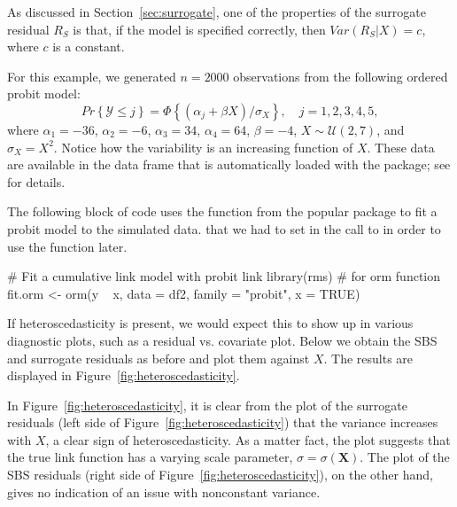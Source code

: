 As discussed in Section~\ref{sec:surrogate}, one of the properties of the surrogate residual $R_S$ is that, if the model is specified correctly, then $Var\left(R_S | X\right) = c$, where $c$ is a constant.

For this example, we generated $n = 2000$ observations from the following ordered probit model:
\begin{equation*}
  Pr\left\{\mathcal{Y} \le j\right\} = \Phi\left\{\left(\alpha_j + \beta X\right) / \sigma_X\right\}, \quad j = 1, 2, 3, 4, 5,
\end{equation*}
where $\alpha_1 = -36$, $\alpha_2 = -6$, $\alpha_3 = 34$, $\alpha_4 = 64$, $\beta = -4$, $X \sim \mathcal{U}\left(2, 7\right)$, and $\sigma_X = X ^ 2$.
Notice how the variability is an increasing function of $X$. These data are available in the  data frame that is automatically loaded with the  package; see  for details.

The following block of code uses the  function from the popular  package to fit a probit model to the simulated data.  that we had to set  in the call to  in order to use the  function later.
\begin{example}
# Fit a cumulative link model with probit link
library(rms)  # for orm function
fit.orm <- orm(y ~ x, data = df2, family = "probit", x = TRUE)
\end{example}

If heteroscedasticity is present, we would expect this to show up in various diagnostic plots, such as a residual vs. covariate plot. Below we obtain the SBS and surrogate residuals as before and plot them against $X$. The results are displayed in Figure~\ref{fig:heteroscedasticity}.

In Figure~\ref{fig:heteroscedasticity}, it is clear from the plot of the surrogate residuals (left side of Figure~\ref{fig:heteroscedasticity}) that the variance increases with $X$, a clear sign of heteroscedasticity. As a matter fact, the plot suggests that the true link function has a varying scale parameter, $\sigma = \sigma\left(\boldsymbol{X}\right)$. The plot of the SBS residuals (right side of Figure~\ref{fig:heteroscedasticity}), on the other hand, gives no indication of an issue with nonconstant variance.

